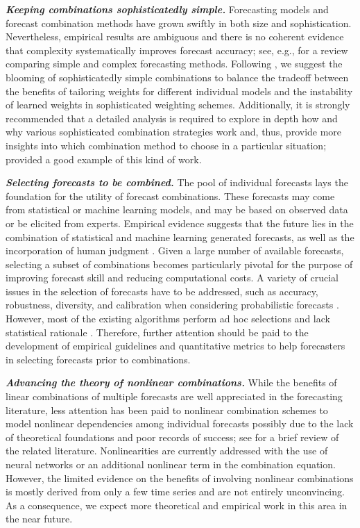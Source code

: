 \documentclass[a4paper,11pt]{article}
\begin{document}
\textbf{\textit{Keeping combinations sophisticatedly simple.}} Forecasting models and forecast combination methods have grown swiftly in both size and sophistication. Nevertheless, empirical results are ambiguous and there is no coherent evidence that complexity systematically improves forecast accuracy; see, e.g., \citet{Green2015-mi} for a review comparing simple and complex forecasting methods. Following \citet{Zellner2001-si}, we suggest the blooming of sophisticatedly simple combinations to balance the tradeoff between the benefits of tailoring weights for different individual models and the instability of learned weights in sophisticated weighting schemes. Additionally, it is strongly recommended that a detailed analysis is required to explore in depth how and why various sophisticated combination strategies work and, thus, provide more insights into which combination method to choose in a particular situation; \citet{Petropoulos2018-fw} provided a good example of this kind of work.

\textbf{\textit{Selecting forecasts to be combined.}} The pool of individual forecasts lays the foundation for the utility of forecast combinations. These forecasts may come from statistical or machine learning models, and may be based on observed data or be elicited from experts. Empirical evidence suggests that the future lies in the combination of statistical and machine learning generated forecasts, as well as the incorporation of human judgment \citep{Petropoulos2018-ad,Makridakis2020-hu,Petropoulos2021-ft}. Given a large number of available forecasts, selecting a subset of combinations becomes particularly pivotal for the purpose of improving forecast skill and reducing computational costs. A variety of crucial issues in the selection of forecasts have to be addressed, such as accuracy, robustness, diversity, and calibration when considering probabilistic forecasts \citep{Lichtendahl2020-ut}. However, most of the existing algorithms perform ad hoc selections and lack statistical rationale \citep{Kourentzes2019-na}. Therefore, further attention should be paid to the development of empirical guidelines and quantitative metrics to help forecasters in selecting forecasts prior to combinations.

\textbf{\textit{Advancing the theory of nonlinear combinations.}} While the benefits of linear combinations of multiple forecasts are well appreciated in the forecasting literature, less attention has been paid to nonlinear combination schemes to model nonlinear dependencies among individual forecasts possibly due to the lack of theoretical foundations and poor records of success; see \citet{Timmermann2006-en} for a brief review of the related literature. Nonlinearities are currently addressed with the use of neural networks or an additional nonlinear term in the combination equation. However, the limited evidence on the benefits of involving nonlinear combinations is mostly derived from only a few time series and are not entirely unconvincing. As a consequence, we expect more theoretical and empirical work in this area in the near future.
\end{document}
